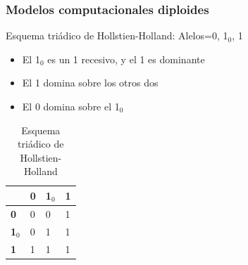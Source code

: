 \documentclass[12pt, twoside, openright]{report} %
\begin{document}
\subsubsection{Modelos computacionales diploides}
Esquema triádico de Hollstien-Holland: Alelos={0, 1$_0$, 1}
\begin{itemize}
	\item El 1$_0$ es un 1 recesivo, y el 1 es dominante
	\item El 1 domina sobre los otros dos
	\item El 0 domina sobre el 1$_0$
\end{itemize} 
\begin{table}[H]
	\centering
	\caption{Esquema triádico de Hollstien-Holland}
	\begin{tabular}{l|l|l|l|}
	\cline{2-4}
	& \textbf{0} & \textbf{1$_0$} & \textbf{1} \\ \hline
	\multicolumn{1}{|l|}{\textbf{0}} & 0 & 0 & 1 \\ \hline
	\multicolumn{1}{|l|}{\textbf{1$_0$}} & 0 & 1 & 1 \\ \hline
	\multicolumn{1}{|l|}{\textbf{1}} & 1 & 1 & 1 \\ \hline
	\end{tabular}
\end{table}
\pagebreak
\end{document}
